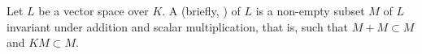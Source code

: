 Let $L$ be a vector space over $K$. A  (briefly, ) of $L$ is a non-empty subset $M$ of $L$ invariant under addition and scalar multiplication, that is, such that $M + M \subset M$ and $KM \subset M$.
